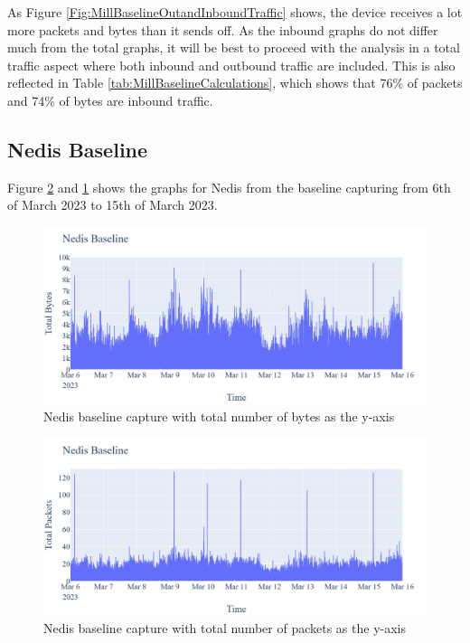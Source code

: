 As Figure \ref{Fig:MillBaselineOutandInboundTraffic} shows, the device receives a lot more packets and bytes than it sends off. As the inbound graphs do not differ much from the total graphs, it will be best to proceed with the analysis in a total traffic aspect where both inbound and outbound traffic are included. This is also reflected in Table \ref{tab:MillBaselineCalculations}, which shows that 76\% of packets and 74\% of bytes are inbound traffic.

\subsection{Nedis Baseline}
Figure \ref{fig:NedisBaselineTotalPackets} and \ref{fig:NedisBaselineTotalBytes} shows the graphs for Nedis from the baseline capturing from 6th of March 2023 to 15th of March 2023. 
\begin{figure} [H]
    \centering
    \includegraphics[scale=0.3]{figures/Nedis_Baseline_TotalBytes.png}
    \caption{Nedis baseline capture with total number of bytes as the y-axis}
    \label{fig:NedisBaselineTotalBytes}
\end{figure}

\begin{figure} [H]         
    \includegraphics[scale=0.3]{figures/Nedis_Baseline_TotalPackets.png}
    \caption{Nedis baseline capture with total number of packets as the y-axis}
    \label{fig:NedisBaselineTotalPackets}
 \end{figure}

